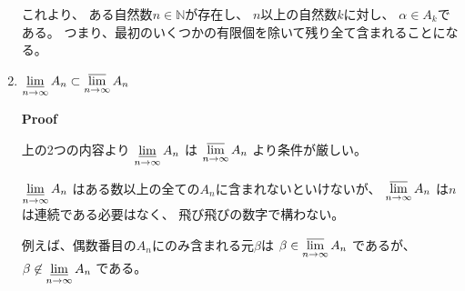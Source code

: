 \documentclass[12pt,b5paper]{ltjsarticle}
\begin{document}
\begin{enumerate}
      これより、
      ある自然数$n\in\mathbb{N}$が存在し、
      $n$以上の自然数$k$に対し、
      $\alpha \in A_{k}$である。
      つまり、最初のいくつかの有限個を除いて残り全て含まれることになる。

      \dotfill
 \item
      $\displaystyle \varliminf_{n\to\infty}A_{n}
      \subset \varlimsup_{n\to\infty}A_{n}$

      \dotfill \textbf{Proof} \dotfill

      上の2つの内容より
      $\displaystyle \varliminf_{n\to\infty}A_{n}$
      は
      $\displaystyle \varlimsup_{n\to\infty}A_{n}$
      より条件が厳しい。

      $\displaystyle \varliminf_{n\to\infty}A_{n}$
      はある数以上の全ての$A_{n}$に含まれないといけないが、
      $\displaystyle \varlimsup_{n\to\infty}A_{n}$
      は$n$は連続である必要はなく、
      飛び飛びの数字で構わない。

      例えば、偶数番目の$A_n$にのみ含まれる元$\beta$は
      $\displaystyle \beta \in \varlimsup_{n\to\infty}A_{n}$
      であるが、
      $\displaystyle \beta \not\in \varliminf_{n\to\infty}A_{n}$
      である。

      
      \dotfill
\end{enumerate}

\hrulefill
\end{document}
